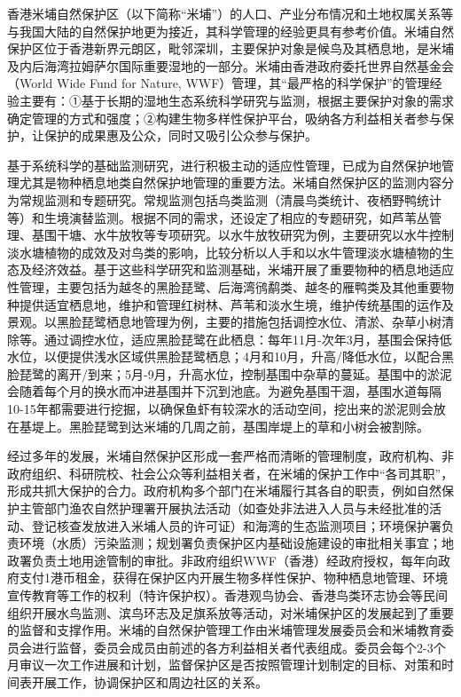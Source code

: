 \documentclass[
]{book}
\begin{document}
香港米埔自然保护区（以下简称``米埔''）的人口、产业分布情况和土地权属关系等与我国大陆的自然保护地更为接近，其科学管理的经验更具有参考价值。米埔自然保护区位于香港新界元朗区，毗邻深圳，主要保护对象是候鸟及其栖息地，是米埔及内后海湾拉姆萨尔国际重要湿地的一部分。米埔由香港政府委托世界自然基金会（World Wide Fund for Nature, WWF）管理，其``最严格的科学保护''的管理经验主要有：①基于长期的湿地生态系统科学研究与监测，根据主要保护对象的需求确定管理的方式和强度；②构建生物多样性保护平台，吸纳各方利益相关者参与保护，让保护的成果惠及公众，同时又吸引公众参与保护。

基于系统科学的基础监测研究，进行积极主动的适应性管理，已成为自然保护地管理尤其是物种栖息地类自然保护地管理的重要方法。米埔自然保护区的监测内容分为常规监测和专题研究。常规监测包括鸟类监测（清晨鸟类统计、夜栖野鸭统计等）和生境演替监测。根据不同的需求，还设定了相应的专题研究，如芦苇丛管理、基围干塘、水牛放牧等专项研究。以水牛放牧研究为例，主要研究以水牛控制淡水塘植物的成效及对鸟类的影响，比较分析以人手和以水牛管理淡水塘植物的生态及经济效益。基于这些科学研究和监测基础，米埔开展了重要物种的栖息地适应性管理，主要包括为越冬的黑脸琵鹭、后海湾鸻鹬类、越冬的雁鸭类及其他重要物种提供适宜栖息地，维护和管理红树林、芦苇和淡水生境，维护传统基围的运作及景观。以黑脸琵鹭栖息地管理为例，主要的措施包括调控水位、清淤、杂草小树清除等。通过调控水位，适应黑脸琵鹭在此栖息：每年11月-次年3月，基围会保持低水位，以便提供浅水区域供黑脸琵鹭栖息；4月和10月，升高/降低水位，以配合黑脸琵鹭的离开/到来；5月-9月，升高水位，控制基围中杂草的蔓延。基围中的淤泥会随着每个月的换水而冲进基围并下沉到池底。为避免基围干涸，基围水道每隔10-15年都需要进行挖掘，以确保鱼虾有较深水的活动空间，挖出来的淤泥则会放在基堤上。黑脸琵鹭到达米埔的几周之前，基围岸堤上的草和小树会被割除。

经过多年的发展，米埔自然保护区形成一套严格而清晰的管理制度，政府机构、非政府组织、科研院校、社会公众等利益相关者，在米埔的保护工作中``各司其职''，形成共抓大保护的合力。政府机构多个部门在米埔履行其各自的职责，例如自然保护主管部门渔农自然护理署开展执法活动（如查处非法进入人员与未经批准的活动、登记核查发放进入米埔人员的许可证）和海湾的生态监测项目；环境保护署负责环境（水质）污染监测；规划署负责保护区内基础设施建设的审批相关事宜；地政署负责土地用途管制的审批。非政府组织WWF（香港）经政府授权，每年向政府支付1港币租金，获得在保护区内开展生物多样性保护、物种栖息地管理、环境宣传教育等工作的权利（特许保护权）。香港观鸟协会、香港鸟类环志协会等民间组织开展水鸟监测、滨鸟环志及足旗系放等活动，对米埔保护区的发展起到了重要的监督和支撑作用。米埔的自然保护管理工作由米埔管理发展委员会和米埔教育委员会进行监督，委员会成员由前述的各方利益相关者代表组成。委员会每个2-3个月审议一次工作进展和计划，监督保护区是否按照管理计划制定的目标、对策和时间表开展工作，协调保护区和周边社区的关系。
\end{document}
